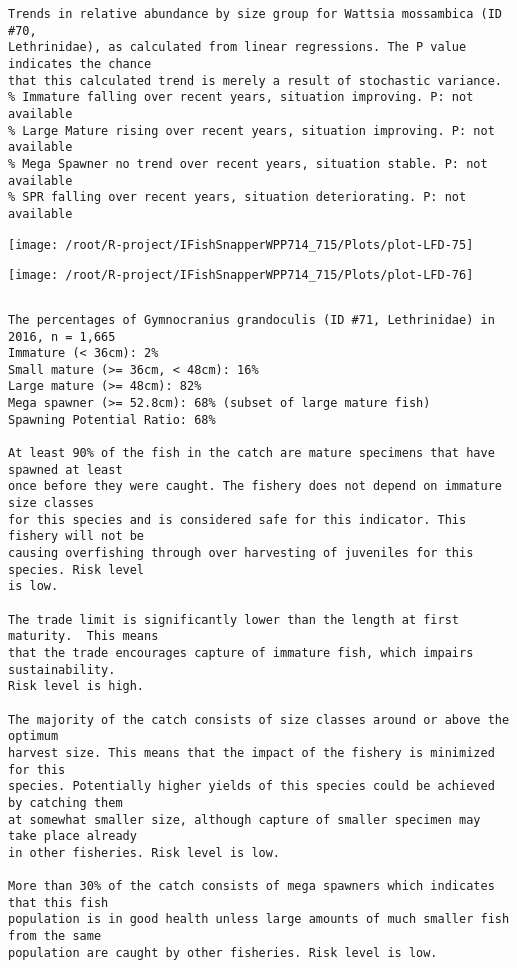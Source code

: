 \documentclass{report}\usepackage[]{graphicx}\usepackage[]{color}
\makeatletter
\def\maxwidth{ %
  \ifdim\Gin@nat@width>\linewidth
    \linewidth
  \else
    \Gin@nat@width
  \fi
}
\newenvironment{kframe}{%
 \def\at@end@of@kframe{}%
 \ifinner\ifhmode%
  \def\at@end@of@kframe{\end{minipage}}%
  \begin{minipage}{\columnwidth}%
 \fi\fi%
 \def\FrameCommand##1{\hskip\@totalleftmargin \hskip-\fboxsep
 \colorbox{shadecolor}{##1}\hskip-\fboxsep
     \hskip-\linewidth \hskip-\@totalleftmargin \hskip\columnwidth}%
 \MakeFramed {\advance\hsize-\width
   \@totalleftmargin\z@ \linewidth\hsize
   \@setminipage}}%
 {\par\unskip\endMakeFramed%
 \at@end@of@kframe}
\newenvironment{knitrout}{}{} %
\makeatother
\begin{document}
\begin{knitrout}
\begin{kframe}
\begin{verbatim}
Trends in relative abundance by size group for Wattsia mossambica (ID #70,
Lethrinidae), as calculated from linear regressions. The P value indicates the chance
that this calculated trend is merely a result of stochastic variance.
% Immature falling over recent years, situation improving. P: not available
% Large Mature rising over recent years, situation improving. P: not available
% Mega Spawner no trend over recent years, situation stable. P: not available
% SPR falling over recent years, situation deteriorating. P: not available
\end{verbatim}
\end{kframe}
\texttt{[image: /root/R-project/IFishSnapperWPP714\_715/Plots/plot-LFD-75]} 

\texttt{[image: /root/R-project/IFishSnapperWPP714\_715/Plots/plot-LFD-76]} 
\begin{kframe}\begin{verbatim}
\end{verbatim}
\end{kframe}
\clearpage
\newpage
\begin{kframe}\begin{verbatim}The percentages of Gymnocranius grandoculis (ID #71, Lethrinidae) in 2016, n = 1,665
Immature (< 36cm): 2%
Small mature (>= 36cm, < 48cm): 16%
Large mature (>= 48cm): 82%
Mega spawner (>= 52.8cm): 68% (subset of large mature fish)
Spawning Potential Ratio: 68%
 
At least 90% of the fish in the catch are mature specimens that have spawned at least
once before they were caught. The fishery does not depend on immature size classes
for this species and is considered safe for this indicator. This fishery will not be
causing overfishing through over harvesting of juveniles for this species. Risk level
is low.

The trade limit is significantly lower than the length at first maturity.  This means
that the trade encourages capture of immature fish, which impairs sustainability.
Risk level is high.

The majority of the catch consists of size classes around or above the optimum
harvest size. This means that the impact of the fishery is minimized for this
species. Potentially higher yields of this species could be achieved by catching them
at somewhat smaller size, although capture of smaller specimen may take place already
in other fisheries. Risk level is low.

More than 30% of the catch consists of mega spawners which indicates that this fish
population is in good health unless large amounts of much smaller fish from the same
population are caught by other fisheries. Risk level is low.
 

\end{verbatim}
\end{kframe}
\end{knitrout}
\end{document}
